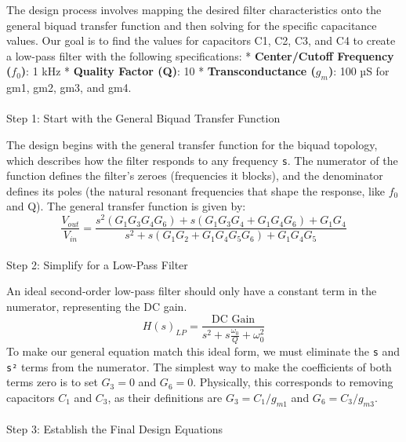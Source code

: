 \documentclass[
  letterpaper,
  DIV=11,
  numbers=noendperiod]{scrreprt}
\makeatletter
\let\oldparagraph\paragraph
\renewcommand{\paragraph}{
    \@ifstar
      \xxxParagraphStar
      \xxxParagraphNoStar
  }
\newcommand{\xxxParagraphStar}[1]{\oldparagraph*{#1}\mbox{}}
\newcommand{\xxxParagraphNoStar}[1]{\oldparagraph{#1}\mbox{}}
\makeatother
\begin{document}
The design process involves mapping the desired filter characteristics
onto the general biquad transfer function and then solving for the
specific capacitance values. Our goal is to find the values for
capacitors C1, C2, C3, and C4 to create a low-pass filter with the
following specifications: * \textbf{Center/Cutoff Frequency (\(f_0\))}:
1 kHz * \textbf{Quality Factor (Q)}: 10 * \textbf{Transconductance
(\(g_m\))}: 100 µS for gm1, gm2, gm3, and gm4.

\paragraph{Step 1: Start with the General Biquad Transfer
Function}\label{step-1-start-with-the-general-biquad-transfer-function}

The design begins with the general transfer function for the biquad
topology, which describes how the filter responds to any frequency
\texttt{s}. The numerator of the function defines the filter's zeroes
(frequencies it blocks), and the denominator defines its poles (the
natural resonant frequencies that shape the response, like \(f_0\) and
Q). The general transfer function is given by:
\[ \frac{V_{out}}{V_{in}} = \frac{s^2(G_1 G_3 G_4 G_6) + s(G_1 G_3 G_4 + G_1 G_4 G_6) + G_1 G_4}{s^2 + s(G_1 G_2 + G_1 G_4 G_5 G_6) + G_1 G_4 G_5} \]

\paragraph{Step 2: Simplify for a Low-Pass
Filter}\label{step-2-simplify-for-a-low-pass-filter}

An ideal second-order low-pass filter should only have a constant term
in the numerator, representing the DC gain.
\[ H(s)_{LP} = \frac{\text{DC Gain}}{s^2 + s\frac{\omega_0}{Q} + \omega_0^2} \]
To make our general equation match this ideal form, we must eliminate
the \texttt{s} and \texttt{s²} terms from the numerator. The simplest
way to make the coefficients of both terms zero is to set \(G_3 = 0\)
and \(G_6 = 0\). Physically, this corresponds to removing capacitors
\(C_1\) and \(C_3\), as their definitions are \(G_3 = C_1 / g_{m1}\) and
\(G_6 = C_3 / g_{m3}\).

\paragraph{Step 3: Establish the Final Design
Equations}\label{step-3-establish-the-final-design-equations}
\end{document}
